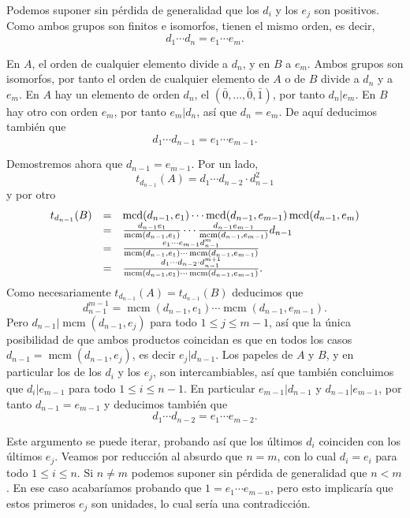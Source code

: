 
Podemos suponer sin pérdida de generalidad que los \(d_i\) y los
\(e_j\) son positivos. Como ambos grupos son finitos e isomorfos,
tienen el mismo orden, es decir, \[d_1\cdots d_n=e_1\cdots e_m.\]

En \(A\), el orden de cualquier elemento divide a \(d_n\), y en \(B\) a
\(e_m\). Ambos grupos son isomorfos, por tanto el orden de cualquier
elemento de \(A\) o de \(B\) divide a \(d_n\) y a \(e_m\). En \(A\)
hay un elemento de orden \(d_n\), el \((\bar 0,\dots,\bar 0,\bar 1)\),
por tanto \(d_n|e_m\). En \(B\) hay otro con orden \(e_m\), por tanto
\(e_m|d_n\), así que \(d_n=e_m\). De aquí deducimos también que
\[d_1\cdots d_{n-1}=e_1\cdots e_{m-1}.\]

Demostremos ahora que \(d_{n-1}=e_{m-1}\). Por un lado,
\[t_{d_{n-1}}(A)=d_1\cdots d_{n-2}\cdot d_{n-1}^2\] y por otro
\[\begin{array}{rcl}
t_{d_{n-1}}(B)&=&\operatorname{mcd}(d_{n-1},e_1)\cdots\operatorname{mcd}(d_{n-1},e_{m-1})\operatorname{mcd}(d_{n-1},e_{m})\cr
&=&\frac{d_{n-1}e_1}{\operatorname{mcm}(d_{n-1},e_1)}\cdots\frac{d_{n-1}e_{m-1}}{\operatorname{mcm}(d_{n-1},e_{m-1})}d_{n-1}\cr
&=&\frac{e_1\cdots e_{m-1}d_{n-1}^m}{\operatorname{mcm}(d_{n-1},e_1)\cdots\operatorname{mcm}(d_{n-1},e_{m-1})}\cr
&=&\frac{d_1\cdots d_{n-2}\cdot d_{n-1}^{m+1}}{\operatorname{mcm}(d_{n-1},e_1)\cdots\operatorname{mcm}(d_{n-1},e_{m-1})}.
\end{array}\] Como necesariamente \(t_{d_{n-1}}(A)=t_{d_{n-1}}(B)\)
deducimos que
\[d_{n-1}^{m-1}=\operatorname{mcm}(d_{n-1},e_1)\cdots\operatorname{mcm}(d_{n-1},e_{m-1}).\]
Pero \(d_{n-1}|\operatorname{mcm}(d_{n-1},e_{j})\) para todo
\(1\leq j\leq m-1\), así que la única posibilidad de que ambos productos
coincidan es que en todos los casos
\(d_{n-1}=\operatorname{mcm}(d_{n-1},e_{j})\), es decir
\(e_j|d_{n-1}\). Los papeles de \(A\) y \(B\), y en particular los de
los \(d_i\) y los \(e_j\), son intercambiables, así que también
concluimos que \(d_i|e_{m-1}\) para todo \(1\leq i\leq n-1\). En
particular \(e_{m-1}|d_{n-1}\) y \(d_{n-1}|e_{m-1}\), por tanto
\(d_{n-1}=e_{m-1}\) y deducimos también que
\[d_1\cdots d_{n-2}=e_1\cdots e_{m-2}.\]

Este argumento se puede iterar, probando así que los últimos \(d_i\)
coinciden con los últimos \(e_j\). Veamos por reducción al absurdo que
\(n=m\), con lo cual \(d_i=e_i\) para todo \(1\leq i\leq n\). Si
\(n\neq m\) podemos suponer sin pérdida de generalidad que \(n{<}m\). En
ese caso acabaríamos probando que \(1=e_1\cdots e_{m-n}\), pero esto
implicaría que estos primeros \(e_j\) son unidades, lo cual sería una
contradicción. 

